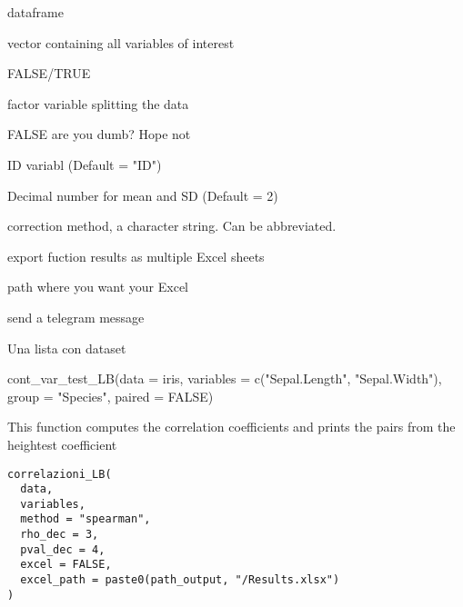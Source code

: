 \documentclass[a4paper]{book}
\begin{document}
%
\begin{Arguments}
\begin{ldescription}
\item[\code{data}] dataframe

\item[\code{variables}] vector containing all variables of interest

\item[\code{paired}] FALSE/TRUE

\item[\code{group}] factor variable splitting the data

\item[\code{dumb}] FALSE are you dumb? Hope not

\item[\code{ID}] ID variabl (Default = "ID")

\item[\code{num\_dec}] Decimal number for mean and SD (Default = 2)

\item[\code{p.adjust.method}] correction method, a character string. Can be abbreviated.

\item[\code{excel}] export fuction results as multiple Excel sheets

\item[\code{excel\_path}] path where you want your Excel

\item[\code{telegram}] send a telegram message
\end{ldescription}
\end{Arguments}
%
\begin{Value}
Una lista con dataset
\end{Value}
%
\begin{Examples}
\begin{ExampleCode}
cont_var_test_LB(data = iris, variables = c("Sepal.Length", "Sepal.Width"), group = "Species", paired = FALSE)
\end{ExampleCode}
\end{Examples}
%
\begin{Description}
This function computes the correlation coefficients and prints the pairs from the heightest coefficient
\end{Description}
%
\begin{Usage}
\begin{verbatim}
correlazioni_LB(
  data,
  variables,
  method = "spearman",
  rho_dec = 3,
  pval_dec = 4,
  excel = FALSE,
  excel_path = paste0(path_output, "/Results.xlsx")
)
\end{verbatim}
\end{Usage}
\end{document}
